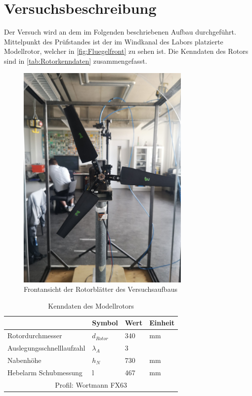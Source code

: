 \section{Versuchsbeschreibung}
\label{section:Versuchsbeschreibung}
Der Versuch wird an dem im Folgenden beschriebenen Aufbau durchgeführt.\\
Mittelpunkt des Prüfstandes ist der im Windkanal des Labors platzierte Modellrotor, welcher in \autoref{fig:Fluegelfront}
zu sehen ist. Die Kenndaten des Rotors sind in \autoref{tab:Rotorkenndaten} zusammengefasst.

\begin{figure}[H]
    \centering
    \includegraphics[width=0.75\textwidth]{Abbildungen/Fluegelfront.jpeg}
    \caption{Frontansicht der Rotorblätter des Versuchsaufbaus}
    \label{fig:Fluegelfront}
\end{figure}


\begin{table}[H]
    \centering
    \begin{tabular}{llll}
    \hline
                              & Symbol      & Wert & Einheit \\ \hline
    Rotordurchmesser          & $d_{Rotor}$ & 340  & mm      \\
    Auslegungsschnelllaufzahl & $\lambda_A$ & 3    &         \\
    Nabenhöhe                 & $h_N$       & 730  & mm      \\
    Hebelarm Schubmessung     & l           & 467  & mm      \\ \hline
    \multicolumn{4}{c}{Profil: Wortmann FX63}                \\ \hline
    \end{tabular}
    \caption{Kenndaten des Modellrotors}
    \label{tab:Rotorkenndaten}
\end{table}

